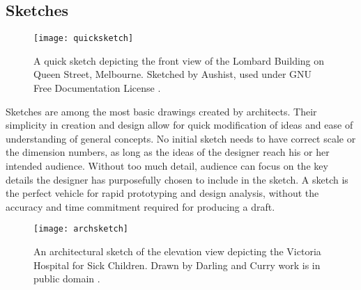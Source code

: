 \subsection{Sketches}

\begin{figure}[ht]
\centering
\texttt{[image: quicksketch]}
\caption[Example of a quick architectural sketch.]{A quick sketch depicting the front view of the Lombard Building on Queen Street, Melbourne. Sketched by Aushist, used under GNU Free Documentation License \cite{quicksketch}.}
\label{fig:quicksketch}
\end{figure}

Sketches are among the most basic drawings created by architects. Their simplicity in creation and design allow for quick modification of ideas and ease of understanding of general concepts. No initial sketch needs to have correct scale or the dimension numbers, as long as the ideas of the designer reach his or her intended audience. Without too much detail, audience can focus on the key details the designer has purposefully chosen to include in the sketch. A sketch is the perfect vehicle for rapid prototyping and design analysis, without the accuracy and time commitment required for producing a draft. \\

\begin{figure}[ht]
\centering
\texttt{[image: archsketch]}
\caption[Example of an architectural sketch - elevation view]{An architectural sketch of the elevation view depicting the Victoria Hospital for Sick Children. Drawn by Darling and Curry work is in public domain \cite{hospital}.}
\label{fig:archsketch}
\end{figure}

